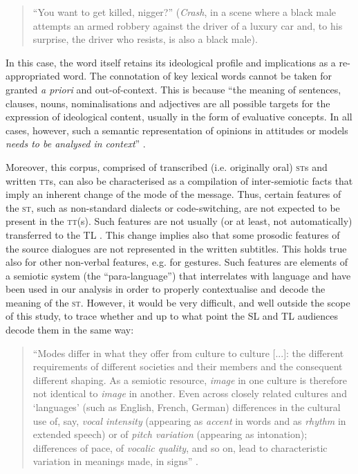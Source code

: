 \documentclass[output=paper]{LSP/langsci}
\begin{document}
\begin{quote}
 “You want to get killed, nigger?”\newline
\noindent (\textit{Crash}, in a scene where a black male attempts an armed robbery against the driver of a luxury car and, to his surprise, the driver who resists, is also a black male).
\end{quote}

In this case, the word itself retains its ideological profile and implications as a re-appropriated word. The connotation of key lexical words cannot be taken for granted \textit{a priori} and out-of-context. This is because “the meaning of sentences, clauses, nouns, nominalisations and adjectives are all possible targets for the expression of ideological content, usually in the form of evaluative concepts. In all cases, however, such a semantic representation of opinions in attitudes or models \textit{needs to be analysed in context}” \citep[260; our emphasis]{Dijk1995}.

Moreover, this corpus, comprised of transcribed (i.e. originally oral) \textsc{st}s and written \textsc{tt}s, can also be characterised as a compilation of inter-semiotic facts \citep{Jakobson2012} that imply an inherent change of the mode of the message. Thus, certain features of the \textsc{st}, such as non-standard dialects or code-switching, are not expected to be present in the \textsc{tt}(s). Such features are not usually (or at least, not automatically) transferred to the TL \citep[78]{Hatim1997}. This change implies also that some prosodic features of the source dialogues are not represented in the written subtitles. This holds true also for other non-verbal features, e.g. for gestures. Such features are elements of a semiotic system (the “para-language”) that interrelates with language \citep[32--42]{Halliday2014} and have been used in our analysis in order to properly contextualise and decode the meaning of the \textsc{st}. However, it would be very difficult, and well outside the scope of this study, to trace whether and up to what point the \textsc{SL} and \textsc{TL} audiences decode them in the same way:

\begin{quote}
“Modes differ in what they offer from culture to culture [...]: the different requirements of different societies and their members and the consequent different shaping. As a semiotic resource, \textit{image} in one culture is therefore not identical to \textit{image} in another. Even across closely related cultures and `languages' (such as English, French, German) differences in the cultural use of, say, \textit{vocal intensity} (appearing as \textit{accent} in words and as \textit{rhythm} in extended speech) or of \textit{pitch variation} (appearing as intonation); differences of pace, of \textit{vocalic quality}, and so on, lead to characteristic variation in meanings made, in signs” \citep[81; emphasis in the original]{Kress2010}.
\end{quote}
\end{document}
